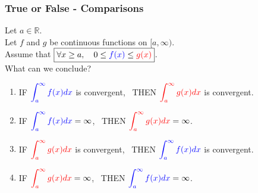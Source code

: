 \documentclass[14pt]{beamer}
\begin{document}
	\begin{frame}[t]
		\fontsize{11}{11}\selectfont
		\frametitle{True or False - Comparisons}

		Let $a \in \mathbb{R}$. \\ Let $f$ and $g$ be continuous functions on
		$[a, \infty)$. \\ Assume that $\displaystyle \boxed{\forall x \geq a, \quad 0 \leq {\color{blue} f(x)} \leq {\color{red} g(x)}}$.
		\\ What can we conclude?

		\begin{enumerate}
			\item IF $\displaystyle{\color{blue} \int_a^{\infty} f(x) dx}$ is convergent,
				\, THEN $\displaystyle{\color{red} \int_a^{\infty} g(x) dx}$ is
				convergent.

			\item IF $\displaystyle{\color{blue} \int_a^{\infty} f(x) dx}= \infty$, \,
				THEN $\displaystyle{\color{red} \int_a^{\infty} g(x) dx}= \infty$.

			\item IF $\displaystyle{\color{red} \int_a^{\infty} g(x) dx}$ is convergent,
				\, THEN $\displaystyle{\color{blue} \int_a^{\infty} f(x) dx}$ is
				convergent.

			\item IF $\displaystyle{\color{red} \int_a^{\infty} g(x) dx}= \infty$, \,
				THEN $\displaystyle{\color{blue} \int_a^{\infty} f(x) dx}= \infty$.
		\end{enumerate}
	\end{frame}
\end{document}

